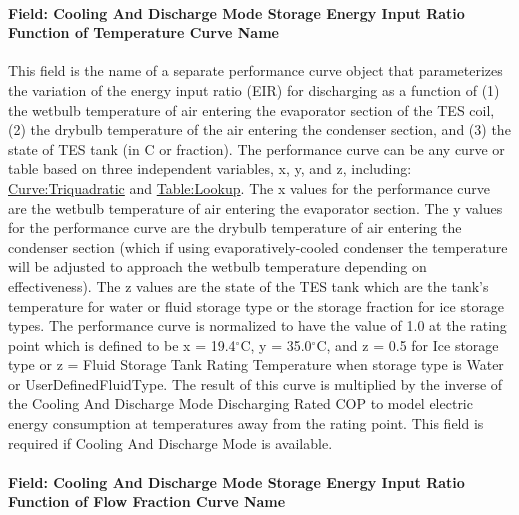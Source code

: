 \paragraph{Field: Cooling And Discharge Mode Storage Energy Input Ratio Function of Temperature Curve Name}\label{field-cooling-and-discharge-mode-storage-energy-input-ratio-function-of-temperature-curve-name}

This field is the name of a separate performance curve object that parameterizes the variation of the energy input ratio (EIR) for discharging as a function of (1) the wetbulb temperature of air entering the evaporator section of the TES coil, (2) the drybulb temperature of the air entering the condenser section, and (3) the state of TES tank (in C or fraction). The performance curve can be any curve or table based on three independent variables, x, y, and z, including: \hyperref[curvetriquadratic]{Curve:Triquadratic} and \hyperref[tablelookup]{Table:Lookup}. The x values for the performance curve are the wetbulb temperature of air entering the evaporator section. The y values for the performance curve are the drybulb temperature of air entering the condenser section (which if using evaporatively-cooled condenser the temperature will be adjusted to approach the wetbulb temperature depending on effectiveness). The z values are the state of the TES tank which are the tank's temperature for water or fluid storage type or the storage fraction for ice storage types. The performance curve is normalized to have the value of 1.0 at the rating point which is defined to be x = 19.4$^\circ$C, y = 35.0$^\circ$C, and z = 0.5 for Ice storage type or z = Fluid Storage Tank Rating Temperature when storage type is Water or UserDefinedFluidType. The result of this curve is multiplied by the inverse of the Cooling And Discharge Mode Discharging Rated COP to model electric energy consumption at temperatures away from the rating point. This field is required if Cooling And Discharge Mode is available.

\paragraph{Field: Cooling And Discharge Mode Storage Energy Input Ratio Function of Flow Fraction Curve Name}\label{field-cooling-and-discharge-mode-storage-energy-input-ratio-function-of-flow-fraction-curve-name}

